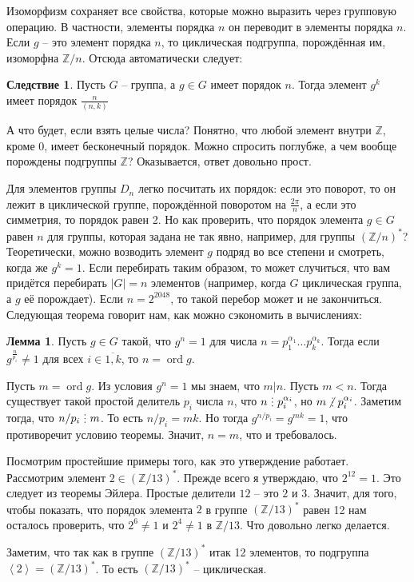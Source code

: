 \documentclass[10pt,a4paper,oneside]{book}
\theoremstyle{definition}
\newtheorem{lem}{\color{green!50!black}Лемма}
\newtheorem{cor}{\color{green!45!black}Следствие}
\newcommand{\mb}[1]{\mathbb{#1}}
\newcommand{\ovl}{\overline}
\newcommand{\ord}{\operatorname{ord}}
\newcommand{\di}{\mathop{\,\scalebox{0.85}{\raisebox{-1.2pt}[0.5\height]{\vdots}}\,}}
\newcommand{\ndi}{\mathop{\not\scalebox{0.85}{\raisebox{-1.2pt}[0.5\height]{\vdots}}\,}}
\def\lan{\left\langle }
\def\ran{\right\rangle}
\def\lm{\begin{lem}}
\def\elm{\end{lem}}
\def\crl{\begin{cor}}
\def\ecrl{\end{cor}}
\begin{document}
Изоморфизм сохраняет все свойства, которые можно выразить через групповую операцию. В частности, элементы порядка $n$ он переводит в элементы порядка $n$. Если $g$ -- это элемент порядка $n$, то циклическая подгруппа, порождённая им, изоморфна $\mb Z/n$. Отсюда автоматически следует: 

\crl Пусть $G$ -- группа, а $g\in G$ имеет порядок $n$. Тогда элемент $g^k$ имеет порядок $\frac{n}{(n,k)}$ 
\ecrl

А что будет, если взять целые числа? Понятно, что любой элемент внутри $\mb Z$, кроме $0$, имеет бесконечный порядок. Можно спросить поглубже, а чем вообще порождены подгруппы $\mb Z$? Оказывается, ответ довольно прост.

Для элементов группы $D_n$ легко посчитать их порядок: если это поворот, то он лежит в циклической группе, порождённой поворотом на $\frac{2\pi}{n}$, а если это симметрия, то порядок равен 2. Но как проверить, что порядок элемента  $g\in G$ равен $n$ для группы, которая задана не так явно, например, для группы $(\mb Z/n)^*$? Теоретически, можно возводить элемент $g$ подряд во все степени и смотреть, когда же $g^k=1$. Если перебирать таким образом, то может случиться, что вам придётся перебирать $|G|=n$ элементов (например, когда $G$ циклическая группа, а $g$ её порождает). Если $n=2^{2048}$, то такой перебор может и не закончиться. Следующая теорема говорит нам, как можно сэкономить в вычислениях:

\lm Пусть $g \in G$ такой, что $g^n=1$ для числа  $n=p_1^{\alpha_1}\dots p_k^{\alpha_k}$. Тогда если $g^{\frac{n}{p_i}}\neq 1$ для всех $i\in\ovl{1,k}$, то $n=\ord g$. 
\elm
\proof Пусть $m=\ord g$. Из условия $g^n=1$ мы знаем, что $m | n$. Пусть $m<n$. Тогда существует такой простой делитель $p_i$ числа $n$, что $n\di p_i^{\alpha_i}$, но $m\ndi p_i^{\alpha_i}$. Заметим тогда, что $n/p_i \di m$. То есть $n/p_i=mk$. Но тогда $g^{n/p_i}=g^{mk}=1$, что противоречит условию теоремы. Значит, $n=m$, что и требовалось.
\endproof

Посмотрим простейшие примеры того, как это утверждение работает. Рассмотрим элемент $2\in (\mb Z/13)^*$. Прежде всего я утверждаю, что $2^{12}=1$. Это следует из теоремы Эйлера. Простые делители $12$ -- это $2$ и $3$. Значит, для того, чтобы показать, что порядок элемента $2$ в группе $(\mb Z/13)^*$ равен 12 нам осталось проверить, что $2^{6}\neq 1$ и $2^4\neq 1$ в $\mb Z/13$. Что довольно легко делается.

Заметим, что так как в группе $(\mb Z/13)^*$ итак 12 элементов, то подгруппа $\lan 2\ran =(\mb Z/13)^*$. То есть $(\mb Z/13)^*$ -- циклическая.
\end{document}
